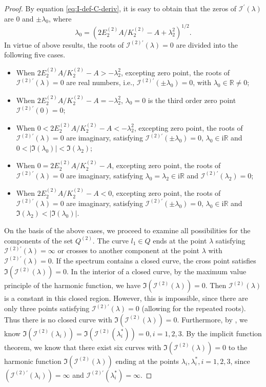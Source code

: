 \documentclass[11pt,reqno]{amsart}
\newcommand{\ii}{\mathrm{i}}
\numberwithin{equation}{section}
\begin{document}
\begin{proof}	
	By equation \eqref{eq:I-def-C-deriv}, it is easy to obtain that the zeros of $\mathcal{I}^{\prime}(\lambda)$ are $0$ and $\pm \lambda_0$, where
	\begin{equation}\label{eq:define-lambda-0}
		\lambda_0=(2E^{(2)}_2A/K^{(2)}_2-A+\lambda_2^2)^{1/2}.
	\end{equation}
	In virtue of above results, the roots of $\mathcal{I}^{(2)\prime}(\lambda)=0$ are divided into the following five cases.
	\begin{itemize}
		\item[(i)] When $2E^{(2)}_2A/K^{(2)}_2-A>-\lambda_2^2$, excepting zero point, the roots of $\mathcal{I}^{(2)\prime}(\lambda)=0$ are real numbers, i.e., $\mathcal{I}^{(2)\prime}(\pm\lambda_0)=0$, with $\lambda_0\in \mathbb{R}\neq 0$;
		\item[(ii)] When $2E^{(2)}_2A/K^{(2)}_2-A=-\lambda_2^2$, $\lambda_0=0$ is the third order zero point $\mathcal{I}^{(2)\prime}(0)=0$;
		\item[(iii)] When $0 < 2E^{(2)}_2A/K^{(2)}_2-A<-\lambda_2^2$, excepting zero point, the roots of $\mathcal{I}^{(2)\prime}(\lambda)=0$ are imaginary, satisfying $\mathcal{I}^{(2)\prime}(\pm\lambda_0)=0$, $\lambda_0 \in \ii\mathbb{R}$ and $0<|\Im(\lambda_0)|< \Im(\lambda_2)$;
		\item[(iv)] When $0=2E^{(2)}_2A/K^{(2)}_2-A$, excepting zero point, the roots of $\mathcal{I}^{(2)\prime}(\lambda)=0$ are imaginary, satisfying $\lambda_0=\lambda_2\in \ii \mathbb{R}$ and $\mathcal{I}^{(2)\prime}(\lambda_2)=0$;
		\item[(v)] When $2E^{(2)}_2A/K^{(2)}_2-A<0$, excepting zero point, the roots of $\mathcal{I}^{(2)\prime}(\lambda)=0$ are imaginary, satisfying $\mathcal{I}^{(2)\prime}(\pm\lambda_0)=0$, $\lambda_0 \in \ii\mathbb{R}$ and $\Im(\lambda_2)<|\Im(\lambda_0)|$.
	\end{itemize}
	
On the basis of the above cases, we proceed to examine all possibilities for the components of the set $Q^{(2)}$. 
	The curve $l_1\in Q$ ends at the point $\lambda$ satisfying $\mathcal{I}^{(2)\prime}(\lambda)=\infty$ or crosses to another component at the point $\lambda$ with $\mathcal{I}^{(2)\prime}(\lambda)=0$. 
	If the spectrum contains a closed curve, the cross point satisfies ${\Im}(\mathcal{I}^{(2)}(\lambda))=0$. 
	In the interior of a closed curve, by the maximum value principle of the harmonic function, we have ${\Im}(\mathcal{I}^{(2)}(\lambda))=0$. 
	Then $\mathcal{I}^{(2)}(\lambda)$ is a constant in this closed region.
	However, this is impossible, since there are only three points satisfying $\mathcal{I}^{(2)\prime}(\lambda)=0$ (allowing for the repeated roots).
	Thus there is no closed curve with ${\Im}(\mathcal{I}^{(2)}(\lambda))=0$. Furthermore, by , we know ${\Im}(\mathcal{I}^{(2)}(\lambda_i))={\Im}(\mathcal{I}^{(2)}(\lambda_i^*))=0, i=1,2,3$. 
	By the implicit function theorem, we know that there exist six curves with ${\Im}(\mathcal{I}^{(2)}(\lambda))=0$ to the harmonic function ${\Im}(\mathcal{I}^{(2)}(\lambda))$ ending at the points $\lambda_i,\lambda_i^*, i=1,2,3$, since $(\mathcal{I}^{(2)\prime}(\lambda_i))=\infty$ and $\mathcal{I}^{(2)\prime}(\lambda_i^*)=\infty$.
	

\end{proof}
\end{document}
